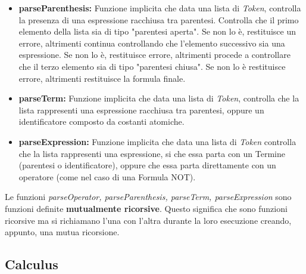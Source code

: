 \documentclass[\main/tesi.tex]{subfiles}
\begin{document}
\begin{itemize}
    \item \textbf{parseParenthesis:} Funzione implicita che data una lista di \textit{Token}, controlla la presenza di una espressione racchiusa tra parentesi. Controlla che il primo elemento della lista sia di tipo "parentesi aperta". Se non lo è, restituisce un errore, altrimenti continua controllando che l'elemento successivo sia una espressione. Se non lo è, restituisce errore, altrimenti procede a controllare che il terzo elemento sia di tipo "parentesi chiusa". Se non lo è restituisce errore, altrimenti restituisce la formula finale.
    \item \textbf{parseTerm:} Funzione implicita che data una lista di \textit{Token}, controlla che la lista rappresenti una espressione racchiusa tra parentesi, oppure un identificatore composto da costanti atomiche.
    \item \textbf{parseExpression:} Funzione implicita che data una lista di \textit{Token} controlla che la lista rappresenti una espressione, si che essa parta con un Termine (parentesi o identificatore), oppure che essa parta direttamente con un operatore (come nel caso di una Formula NOT).
\end{itemize}
Le funzioni \textit{parseOperator, parseParenthesis, parseTerm, parseExpression} sono funzioni definite \textbf{mutualmente ricorsive}. Questo significa che sono funzioni ricorsive ma si richiamano l'una con l'altra durante la loro esecuzione creando, appunto, una mutua ricorsione.

\subsection{Calculus}
\end{document}
